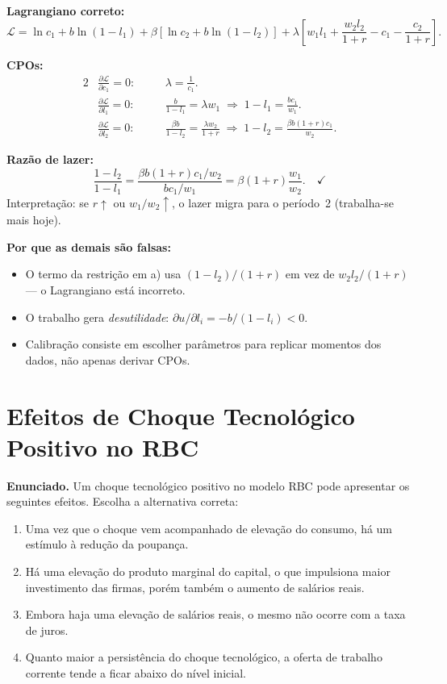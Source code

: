 \documentclass[12pt, a4paper]{article}
\begin{document}
\begin{correctbox}[title={Resposta correta: b)}]
\textbf{Lagrangiano correto:}
\[
\mathcal{L} = \ln c_1 + b\ln(1-l_1) + \beta[\ln c_2 + b\ln(1-l_2)]
  + \lambda\!\left[w_1 l_1 + \frac{w_2 l_2}{1+r} - c_1 - \frac{c_2}{1+r}\right].
\]

\textbf{CPOs:}
\begin{alignat}{2}
&\frac{\partial\mathcal{L}}{\partial c_1}=0: &\quad& \lambda = \frac{1}{c_1}. \\[4pt]
&\frac{\partial\mathcal{L}}{\partial l_1}=0: &\quad& \frac{b}{1-l_1} = \lambda w_1
  \;\Longrightarrow\; 1-l_1 = \frac{bc_1}{w_1}. \\[4pt]
&\frac{\partial\mathcal{L}}{\partial l_2}=0: &\quad& \frac{\beta b}{1-l_2} = \frac{\lambda w_2}{1+r}
  \;\Longrightarrow\; 1-l_2 = \frac{\beta b(1+r)c_1}{w_2}.
\end{alignat}

\textbf{Razão de lazer:}
\[
\frac{1-l_2}{1-l_1}
  = \frac{\beta b(1+r)c_1/w_2}{bc_1/w_1}
  = \beta(1+r)\frac{w_1}{w_2}. \quad\checkmark
\]
Interpretação: se $r\uparrow$ ou $w_1/w_2\uparrow$, o lazer migra para o período~2
(trabalha-se mais hoje).

\textbf{Por que as demais são falsas:}
\begin{itemize}[leftmargin=*]
\item[a)] O termo da restrição em a) usa $(1-l_2)/(1+r)$ em vez de $w_2 l_2/(1+r)$ ---
o Lagrangiano está incorreto.
\item[c)] O trabalho gera \emph{desutilidade}: $\partial u/\partial l_i = -b/(1-l_i) < 0$.
\item[d)] Calibração consiste em escolher parâmetros para replicar momentos dos dados,
não apenas derivar CPOs.
\end{itemize}
\end{correctbox}

\section{Efeitos de Choque Tecnológico Positivo no RBC}

\textbf{Enunciado.} Um choque tecnológico positivo no modelo RBC pode apresentar os seguintes efeitos. Escolha a alternativa correta:

\begin{enumerate}[label=\alph*)]
\item Uma vez que o choque vem acompanhado de elevação do consumo, há um estímulo à redução da poupança.
\item Há uma elevação do produto marginal do capital, o que impulsiona maior investimento das firmas, porém também o aumento de salários reais.
\item Embora haja uma elevação de salários reais, o mesmo não ocorre com a taxa de juros.
\item Quanto maior a persistência do choque tecnológico, a oferta de trabalho corrente tende a ficar abaixo do nível inicial.
\end{enumerate}
\end{document}
